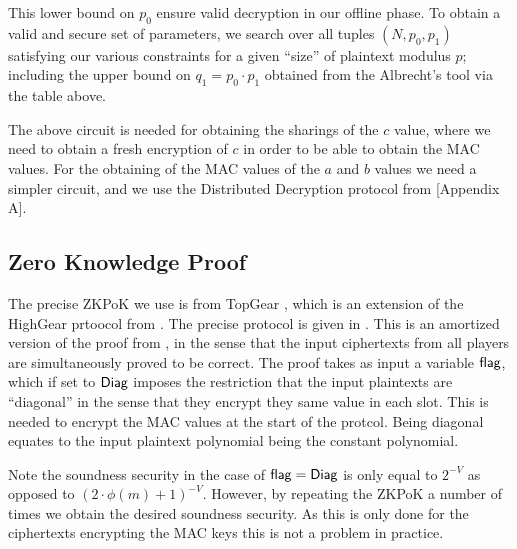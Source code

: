 This lower bound on $p_0$ ensure valid decryption in our offline phase.
To obtain a valid and secure set of parameters, we search over
all tuples $(N,p_0,p_1)$ satisfying our various constraints for
a given ``size'' of plaintext modulus $p$; including the upper bound
on $q_1=p_0 \cdot p_1$ obtained from the Albrecht's tool via
the table above.

The above circuit is needed for obtaining the sharings of the $c$
value, where we need to obtain a fresh encryption of $c$ in order
to be able to obtain the MAC values.
For the obtaining of the MAC values of the $a$ and $b$ values
we need a simpler circuit, and we use the Distributed Decryption
protocol from \cite{KPR}[Appendix A].

\subsection{Zero Knowledge Proof}
The precise ZKPoK we use is from TopGear \cite{TopGear}, which
is an extension of the HighGear prtoocol from \cite{KPR}.
The precise protocol is given in .
This is an amortized version of the proof from \cite{SPDZ}, in the sense
that the input ciphertexts from all players are simultaneously proved to be
correct.
The proof takes as input a variable $\mathsf{flag}$, which if set to $\mathsf{Diag}$
imposes the restriction that the input plaintexts are ``diagonal'' in
the sense that they encrypt they same value in each slot.
This is needed to encrypt the MAC values at the start of the protcol.
Being diagonal equates to the input plaintext polynomial being the constant
polynomial.



Note the soundness security in the case of $\mathsf{flag}=\mathsf{Diag}$ is only
equal to $2^{-V}$ as opposed to $(2 \cdot \phi(m)+1)^{-V}$.
However, by repeating the ZKPoK a number of times we obtain
the desired soundness security. As this is only done for
the ciphertexts encrypting the MAC keys this is not a problem in
practice.
